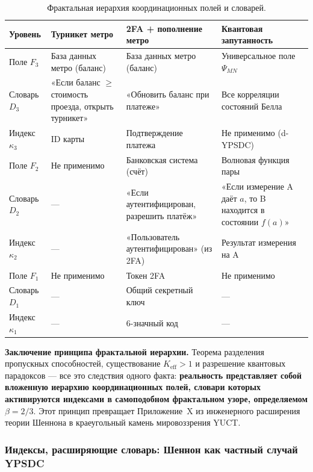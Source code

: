 \documentclass[12pt,a4paper]{article}
\theoremstyle{remark}
\begin{document}
	\begin{table}[htbp]
		\centering
		\caption{Фрактальная иерархия координационных полей и словарей.}
		\label{tab:fractal-examples}
		\small
		\begin{tabular}{p{2.5cm} p{3.5cm} p{3.5cm} p{3.5cm}}
			\toprule
			\textbf{Уровень} & \textbf{Турникет метро} & \textbf{2FA + пополнение метро} & \textbf{Квантовая запутанность} \\
			\midrule
			Поле $F_3$ & База данных метро (баланс) & База данных метро (баланс) & Универсальное поле $\Psi_{MN}$ \\
			Словарь $D_3$ & «Если баланс $\ge$ стоимость проезда, открыть турникет» & «Обновить баланс при платеже» & Все корреляции состояний Белла \\
			Индекс $\kappa_3$ & ID карты & Подтверждение платежа & Не применимо (d-YPSDC) \\
			\midrule
			Поле $F_2$ & Не применимо & Банковская система (счёт) & Волновая функция пары \\
			Словарь $D_2$ & --- & «Если аутентифицирован, разрешить платёж» & «Если измерение A даёт $a$, то B находится в состоянии $f(a)$» \\
			Индекс $\kappa_2$ & --- & «Пользователь аутентифицирован» (из 2FA) & Результат измерения на A \\
			\midrule
			Поле $F_1$ & Не применимо & Токен 2FA & Не применимо \\
			Словарь $D_1$ & --- & Общий секретный ключ & --- \\
			Индекс $\kappa_1$ & --- & 6-значный код & --- \\
			\bottomrule
		\end{tabular}
	\end{table}
	
	\noindent
	\textbf{Заключение принципа фрактальной иерархии.}
	Теорема разделения пропускных способностей, существование $K_{\mathrm{eff}}>1$ и разрешение квантовых парадоксов — все это следствия одного факта: \textbf{реальность представляет собой вложенную иерархию координационных полей, словари которых активируются индексами в самоподобном фрактальном узоре, определяемом $\beta=2/3$}. Этот принцип превращает Приложение~X из инженерного расширения теории Шеннона в краеугольный камень мировоззрения YUCT.
	
	\subsubsection{Индексы, расширяющие словарь: Шеннон как частный случай YPSDC}
	
\end{document}
